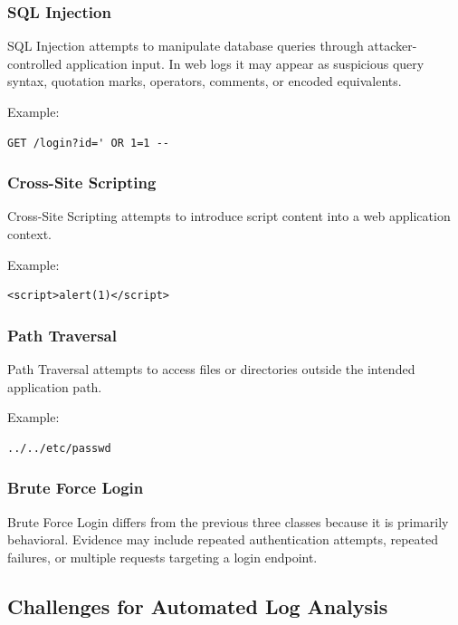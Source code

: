 \subsubsection{SQL Injection}\label{sql-injection}

SQL Injection attempts to manipulate database queries through
attacker-controlled application input. In web logs it may appear as
suspicious query syntax, quotation marks, operators, comments, or
encoded equivalents.

Example:

\begin{lstlisting}
GET /login?id=' OR 1=1 --
\end{lstlisting}

\subsubsection{Cross-Site Scripting}\label{cross-site-scripting}

Cross-Site Scripting attempts to introduce script content into a web
application context.

Example:

\begin{lstlisting}
<script>alert(1)</script>
\end{lstlisting}

\subsubsection{Path Traversal}\label{path-traversal}

Path Traversal attempts to access files or directories outside the
intended application path.

Example:

\begin{lstlisting}
../../etc/passwd
\end{lstlisting}

\subsubsection{Brute Force Login}\label{brute-force-login}

Brute Force Login differs from the previous three classes because it is
primarily behavioral. Evidence may include repeated authentication
attempts, repeated failures, or multiple requests targeting a login
endpoint.

\subsection{Challenges for Automated Log
Analysis}\label{challenges-for-automated-log-analysis}


